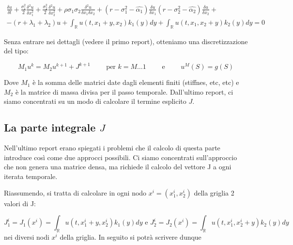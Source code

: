 \documentclass[a4paper,10pt]{article}
\newcommand{\der}[2]{\frac{\delta #1}{\delta #2}}
\newcommand{\dder}[2]{\frac{\delta^2 #1}{\delta #2^2}}
\newcommand{\dmix}[3]{\frac{\delta^2 #1}{\delta #2 \delta #3}}
\begin{document}
{
\small
\begin{multline}
 \der{u}{t}+\frac{\sigma_1^2}{2}\dder{u}{x_1}+\frac{\sigma_2^2}{2}\dder{u}{x_2}+\rho\sigma_1\sigma_2\dmix{u}{x_1}{x_2}+
 \left(r-\sigma_1^2-\hat{\alpha_1}\right)\der{u}{x_1}
 \left(r-\sigma_2^2-\hat{\alpha_2}\right)\der{u}{x_2}+\\-(r+\lambda_1+\lambda_2)u+
 \int_\mathbb{R}u(t,x_1+y,x_2)k_1(y)dy+
 \int_\mathbb{R}u(t,x_1,x_2+y)k_2(y)dy=0
 \label{eq:costcoeff2}
\end{multline}
}


Senza entrare nei dettagli (vedere il primo report), otteniamo una discretizzazione del tipo:

\begin{equation}
 M_1u^k=M_2u^{k+1}+J^{k+1}  \qquad \text{ per } k=M\dots1 \qquad \text{ e } \qquad u^{M}(S)=g(S) 
\end{equation}

Dove $M_1$ è la somma delle matrici date dagli elementi finiti (stiffnes, etc, etc) e $M_2$ è la matrice di massa divisa per il passo temporale. Dall'ultimo report, ci siamo concentrati su un modo di calcolare il termine esplicito $J$.

\subsection{La parte integrale $J$}

Nell'ultimo report erano spiegati i problemi che il calcolo di questa parte introduce così come due approcci possibili. Ci siamo concentrati sull'approccio che non genera una matrice densa, ma richiede il calcolo del vettore J a ogni iterata temporale.

Riassumendo, si tratta di calcolare in ogni nodo $x^i=(x_1^i,x_2^i)$ della griglia 2 valori di J: 

\begin{equation*}
 J_1^i=J_1(x^i)=\int_\mathbb{R}u(t,x_1^i+y,x_2^i)k_1(y)dy \text{ e } J_2^i=J_2(x^i)=\int_\mathbb{R}u(t,x_1^i,x_2^i+y)k_2(y)dy
\end{equation*}
nei diversi nodi $x^i$ della griglia. In seguito si potrà scrivere dunque 
\end{document}
